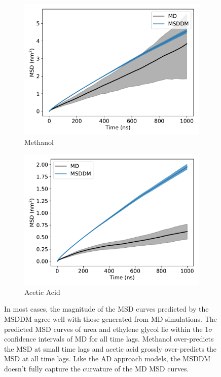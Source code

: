 \documentclass[aps,pre,preprint,groupedaddress,longbibliography]{revtex4-2}
\begin{document}
\begin{figure}
\begin{subfigure}{0.45\textwidth}
  \includegraphics[width=\textwidth]{MET_msddm.pdf}
  \caption{Methanol}\label{fig:MET_msddm}
  \end{subfigure}
  \begin{subfigure}{0.45\textwidth}
  \includegraphics[width=\textwidth]{ACH_msddm.pdf}
  \caption{Acetic Acid}\label{fig:ACH_msddm}
  \end{subfigure}
  \caption{In most cases, the magnitude of the MSD curves predicted by the
	  MSDDM agree well with those generated from MD simulations. The
	  predicted MSD curves of urea and ethylene glycol lie within the
	  1$\sigma$ confidence intervals of MD for all time lags. Methanol
	  over-predicts the MSD at small time lags and acetic acid grossly
	  over-predicts the MSD at all time lags.  Like the AD approach models,
	  the MSDDM doesn't fully capture the curvature of the MD MSD curves.
	  }\label{fig:msddm_performance}
  \end{figure}
  
\end{document}
